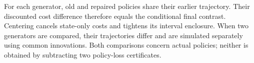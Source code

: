 For each generator, old and repaired policies share their earlier trajectory. Their discounted cost difference therefore equals the conditional final contrast. Centering cancels state-only costs and tightens its interval enclosure. When two generators are compared, their trajectories differ and are simulated separately using common innovations. Both comparisons concern actual policies; neither is obtained by subtracting two policy-loss certificates.
